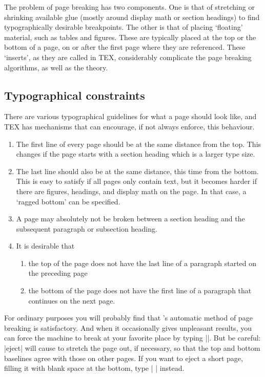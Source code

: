The problem of page breaking has two components. One is that of stretching or shrinking
available glue (mostly around display math or section headings) to find typographically
desirable breakpoints. The other is that of placing ‘floating’ material, such as tables and
figures. These are typically placed at the top or the bottom of a page, on or after the first
page where they are referenced. These ‘inserts’, as they are called in TEX, considerably
complicate the page breaking algorithms, as well as the theory.

\subsection{Typographical constraints}

There are various typographical guidelines for what a page should look like, and TEX has
mechanisms that can encourage, if not always enforce, this behaviour.

\begin{enumerate}
\item The first line of every page should be at the same distance from the top. This changes
if the page starts with a section heading which is a larger type size.

\item The last line should also be at the same distance, this time from the bottom. This
is easy to satisfy if all pages only contain text, but it becomes harder if there are
figures, headings, and display math on the page. In that case, a ‘ragged bottom’ can
be specified.

\item  A page may absolutely not be broken between a section heading and the subsequent
paragraph or subsection heading.

\item It is desirable that

\begin{enumerate}
\item the top of the page does not have the last line of a paragraph started on the
preceding page

\item the bottom of the page does not have the first line of a paragraph that continues
on the next page.
\end{enumerate}

\end{enumerate}



For ordinary purposes you will probably find that \tex's automatic
method of page breaking is satisfactory. And when it occasionally gives unpleasant
results, you can force the machine to break at your favorite place by
typing |\eject|. But be careful: |eject| will cause \tex to stretch the page
out, if necessary, so that the top and bottom baselines agree with those on other
pages.  If you want to eject a short page, filling it with blank space at the bottom,
type | \vfill\eject|  instead.

